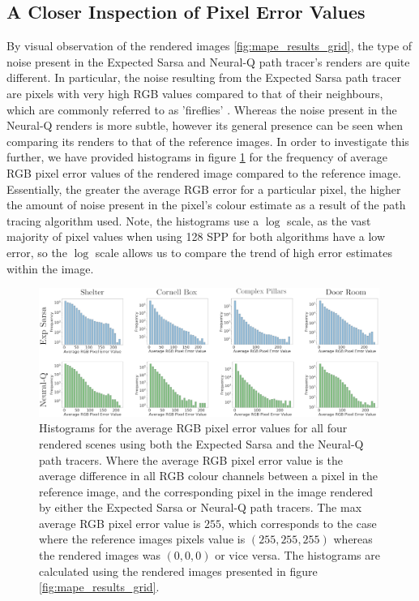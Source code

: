 \documentclass[../dissertation.tex]{subfiles}
\begin{document}
\pagebreak

\subsection{A Closer Inspection of Pixel Error Values}
\label{sec:close_inspec_pixels}

By visual observation of the rendered images \ref{fig:mape_results_grid}, the type of noise present in the Expected Sarsa and Neural-Q path tracer's renders are quite different. In particular, the noise resulting from the Expected Sarsa path tracer are pixels with very high RGB values compared to that of their neighbours, which are commonly referred to as 'fireflies'  \cite{christensen2016path}. Whereas the noise present in the Neural-Q renders is more subtle, however its general presence can be seen when comparing its renders to that of the reference images. In order to investigate this further, we have provided histograms in figure \ref{fig:histogram_errors} for the frequency of average RGB pixel error values of the rendered image compared to the reference image. Essentially, the greater the average RGB error for a particular pixel, the higher the amount of noise present in the pixel's colour estimate as a result of the path tracing algorithm used. Note, the histograms use a $\log$ scale, as the vast majority of pixel values when using 128 SPP for both algorithms have a low error, so the $\log$ scale allows us to compare the trend of high error estimates within the image. 

\begin{figure}[h]
\begin{center}
\includegraphics[width=0.99\textwidth]{images/noise_diff.png}    
\end{center}
\caption{Histograms for the average RGB pixel error values for all four rendered scenes using both the Expected Sarsa and the Neural-Q path tracers. Where the average RGB pixel error value is the average difference in all RGB colour channels between a pixel in the reference image, and the corresponding pixel in the image rendered by either the Expected Sarsa or Neural-Q path tracers. The max average RGB pixel error value is $255$, which corresponds to the case where the reference images pixels value is $(255,255,255)$ whereas the rendered images was $(0,0,0)$ or vice versa. The histograms are calculated using the rendered images presented in figure \ref{fig:mape_results_grid}.}
\label{fig:histogram_errors}
\end{figure}
\end{document}
